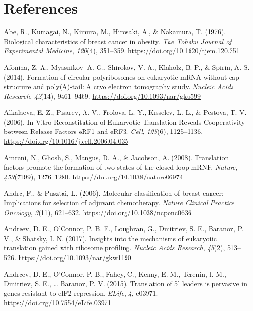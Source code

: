 \documentclass[12pt,openany]{book}
\begin{document}
\chapter*{References}\label{references}

\hypertarget{refs}{}
\hypertarget{ref-Abe1976}{}
Abe, R., Kumagai, N., Kimura, M., Hirosaki, A., \& Nakamura, T. (1976).
Biological characteristics of breast cancer in obesity. \emph{The Tohoku
Journal of Experimental Medicine}, \emph{120}(4), 351--359.
\url{https://doi.org/10.1620/tjem.120.351}

\hypertarget{ref-Afonina2014}{}
Afonina, Z. A., Myasnikov, A. G., Shirokov, V. A., Klaholz, B. P., \&
Spirin, A. S. (2014). Formation of circular polyribosomes on eukaryotic
mRNA without cap-structure and poly(A)-tail: A cryo electron tomography
study. \emph{Nucleic Acids Research}, \emph{42}(14), 9461--9469.
\url{https://doi.org/10.1093/nar/gku599}

\hypertarget{ref-Alkalaeva2006}{}
Alkalaeva, E. Z., Pisarev, A. V., Frolova, L. Y., Kisselev, L. L., \&
Pestova, T. V. (2006). In Vitro Reconstitution of Eukaryotic Translation
Reveals Cooperativity between Release Factors eRF1 and eRF3.
\emph{Cell}, \emph{125}(6), 1125--1136.
\url{https://doi.org/10.1016/j.cell.2006.04.035}

\hypertarget{ref-Amrani2008}{}
Amrani, N., Ghosh, S., Mangus, D. A., \& Jacobson, A. (2008).
Translation factors promote the formation of two states of the
closed-loop mRNP. \emph{Nature}, \emph{453}(7199), 1276--1280.
\url{https://doi.org/10.1038/nature06974}

\hypertarget{ref-Andre2006}{}
Andre, F., \& Pusztai, L. (2006). Molecular classification of breast
cancer: Implications for selection of adjuvant chemotherapy.
\emph{Nature Clinical Practice Oncology}, \emph{3}(11), 621--632.
\url{https://doi.org/10.1038/ncponc0636}

\hypertarget{ref-Andreev2017}{}
Andreev, D. E., O'Connor, P. B. F., Loughran, G., Dmitriev, S. E.,
Baranov, P. V., \& Shatsky, I. N. (2017). Insights into the mechanisms
of eukaryotic translation gained with ribosome profiling. \emph{Nucleic
Acids Research}, \emph{45}(2), 513--526.
\url{https://doi.org/10.1093/nar/gkw1190}

\hypertarget{ref-Andreev2015}{}
Andreev, D. E., O'Connor, P. B., Fahey, C., Kenny, E. M., Terenin, I.
M., Dmitriev, S. E., \ldots{} Baranov, P. V. (2015). Translation of 5'
leaders is pervasive in genes resistant to eIF2 repression.
\emph{ELife}, \emph{4}, e03971.
\url{https://doi.org/10.7554/eLife.03971}
\end{document}
